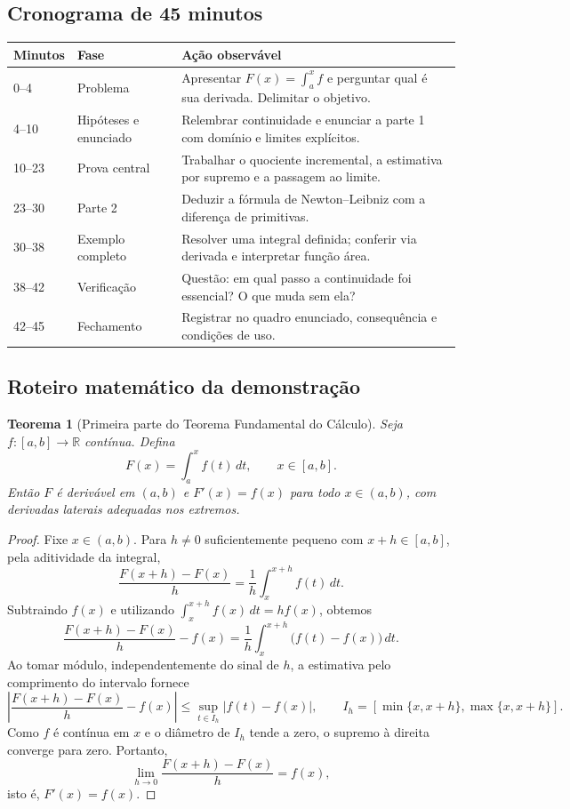 \documentclass[11pt,a4paper]{article}
\newtheorem{teorema}{Teorema}
\begin{document}
\subsection{Cronograma de 45 minutos}
\begin{tabularx}{\textwidth}{p{}p{}X}
\toprule
\textbf{Minutos} & \textbf{Fase} & \textbf{Ação observável}\\\midrule
0--4 & Problema & Apresentar $F(x)=\int_a^x f$ e perguntar qual é sua derivada. Delimitar o objetivo.\\
4--10 & Hipóteses e enunciado & Relembrar continuidade e enunciar a parte 1 com domínio e limites explícitos.\\
10--23 & Prova central & Trabalhar o quociente incremental, a estimativa por supremo e a passagem ao limite.\\
23--30 & Parte 2 & Deduzir a fórmula de Newton--Leibniz com a diferença de primitivas.\\
30--38 & Exemplo completo & Resolver uma integral definida; conferir via derivada e interpretar função área.\\
38--42 & Verificação & Questão: em qual passo a continuidade foi essencial? O que muda sem ela?\\
42--45 & Fechamento & Registrar no quadro enunciado, consequência e condições de uso.\\\bottomrule
\end{tabularx}

\subsection{Roteiro matemático da demonstração}
\begin{teorema}[Primeira parte do Teorema Fundamental do Cálculo]
Seja $f:[a,b]\to\mathbb R$ contínua. Defina
\[
F(x)=\int_a^x f(t)\,dt,\qquad x\in[a,b].
\]
Então $F$ é derivável em $(a,b)$ e $F'(x)=f(x)$ para todo $x\in(a,b)$, com derivadas laterais adequadas nos extremos.
\end{teorema}

\begin{proof}
Fixe $x\in(a,b)$. Para $h\ne0$ suficientemente pequeno com $x+h\in[a,b]$, pela aditividade da integral,
\[
\frac{F(x+h)-F(x)}{h}=\frac{1}{h}\int_x^{x+h}f(t)\,dt.
\]
Subtraindo $f(x)$ e utilizando $\int_x^{x+h}f(x)\,dt=h f(x)$, obtemos
\[
\frac{F(x+h)-F(x)}{h}-f(x)
=\frac{1}{h}\int_x^{x+h}\bigl(f(t)-f(x)\bigr)\,dt.
\]
Ao tomar módulo, independentemente do sinal de $h$, a estimativa pelo comprimento do intervalo fornece
\[
\left|\frac{F(x+h)-F(x)}{h}-f(x)\right|
\le \sup_{t\in I_h}|f(t)-f(x)|,
\qquad I_h=[\min\{x,x+h\},\max\{x,x+h\}].
\]
Como $f$ é contínua em $x$ e o diâmetro de $I_h$ tende a zero, o supremo à direita converge para zero. Portanto,
\[
\lim_{h\to0}\frac{F(x+h)-F(x)}{h}=f(x),
\]
isto é, $F'(x)=f(x)$.
\end{proof}
\end{document}
